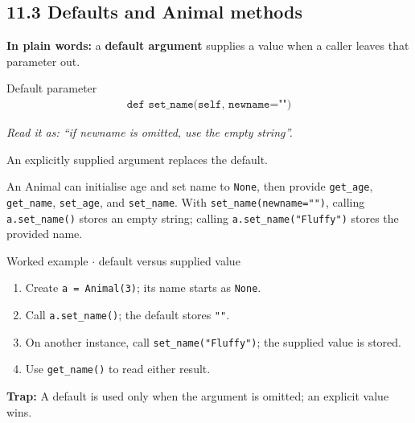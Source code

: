 \documentclass[11pt]{article}
\begin{document}
\begin{keepsection}
\section{11.3 Defaults and Animal methods}

\begin{plainbox}\textbf{In plain words:} a \textbf{default argument} supplies a value when a caller leaves that parameter out.\end{plainbox}

\begin{equationcard}{Default parameter}
\[ \begin{gathered} \texttt{def set\_name(self, newname="")} \end{gathered} \]
{\small \emph{Read it as: “if newname is omitted, use the empty string”.}\par An explicitly supplied argument replaces the default.}
\end{equationcard}

An Animal can initialise age and set name to \texttt{None}, then provide \texttt{get\_age}, \texttt{get\_name}, \texttt{set\_age}, and \texttt{set\_name}. With \texttt{set\_name(newname="")}, calling \texttt{a.set\_name()} stores an empty string; calling \texttt{a.set\_name("Fluffy")} stores the provided name.

\begin{workedbox}{Worked example \ensuremath{\cdot} default versus supplied value}
\begin{enumerate}
\item Create \texttt{a = Animal(3)}; its name starts as \texttt{None}.
\item Call \texttt{a.set\_name()}; the default stores \texttt{""}.
\item On another instance, call \texttt{set\_name("Fluffy")}; the supplied value is stored.
\item Use \texttt{get\_name()} to read either result.
\end{enumerate}
\end{workedbox}

\begin{notebox}\textbf{Trap:} A default is used only when the argument is omitted; an explicit value wins.\end{notebox}


\end{keepsection}
\end{document}
